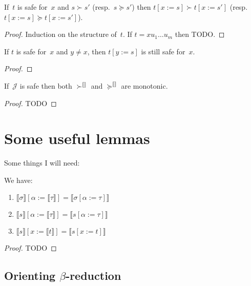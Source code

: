 \documentclass[runningheads,a4paper]{llncs}
\newcommand{\Termmap}{\mathcal{J}}
\newcommand{\succinterpret}{\succ^{\llbracket\rrbracket}}
\newcommand{\succeqinterpret}{\succeq^{\llbracket\rrbracket}}
\newcommand{\typeinterpret}[1]{\llbracket #1 \rrbracket}
\newcommand{\interpret}[1]{\llbracket #1 \rrbracket}
\newcommand{\subst}[2]{#1:=#2}
\begin{document}
\begin{lemma}
  If~$t$ is safe for~$x$ and $s \succ s'$ (resp.~$s \succeq s'$) then
  $t[\subst{x}{s}] \succ t[\subst{x}{s'}]$ (resp.~$t[\subst{x}{s}]
  \succeq t[\subst{x}{s'}]$).
\end{lemma}

\begin{proof}
  Induction on the structure of~$t$. If $t = x u_1 \ldots u_m$ then
  TODO.
\end{proof}

\begin{lemma}
  If $t$ is safe for~$x$ and $y \ne x$, then $t[\subst{y}{s}]$ is
  still safe for~$x$.
\end{lemma}

\begin{proof}
\end{proof}

\begin{lemma}
  If~$\Termmap$ is safe then both $\succinterpret$ and
  $\succeqinterpret$ are monotonic.
\end{lemma}

\begin{proof}
  TODO
\end{proof}

\section{Some useful lemmas}

Some things I will need:

\begin{lemma}\label{lem:substitutioninterpret}
We have:
\begin{enumerate}
\item\label{lem:substitutioninterpret:types}
  $\typeinterpret{\sigma}[\alpha:=\typeinterpret{\tau}] =
  \typeinterpret{\sigma[\alpha:=\tau]}$
\item\label{lem:substitutioninterpret:mixed}
  $\interpret{s}[\alpha:=\typeinterpret{\tau}] =
  \interpret{s[\alpha:=\tau]}$
\item\label{lem:substitutioninterpret:terms}
  $\interpret{s}[x:=\interpret{t}] = \interpret{s[x:=t]}$
\end{enumerate}
\end{lemma}

\begin{proof}
TODO
\end{proof}

\subsection{Orienting $\beta$-reduction}
\end{document}
